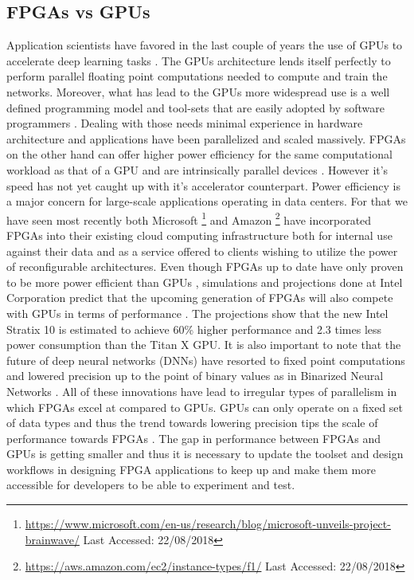 \subsection{FPGAs vs GPUs}
Application scientists have favored in the last couple of years the use of GPUs to accelerate deep learning tasks \cite{raina2009large}. The GPUs architecture lends itself perfectly to perform parallel floating point computations needed to compute and train the networks. Moreover, what has lead to the GPUs more widespread use is a well defined programming model and tool-sets that are easily adopted by software programmers \cite{cuda}. Dealing with those needs minimal experience in hardware architecture and applications have been parallelized and scaled massively. 
FPGAs on the other hand can offer higher power efficiency for the same computational workload as that of a GPU and are intrinsically parallel devices \cite{nurvitadhi2017can}. However it’s speed has not yet caught up with it’s accelerator counterpart. Power efficiency is a major concern for large-scale applications operating in data centers. For that we have seen most recently both Microsoft \footnote{\url{https://www.microsoft.com/en-us/research/blog/microsoft-unveils-project-brainwave/} Last Accessed: 22/08/2018} and Amazon \footnote{\url{https://aws.amazon.com/ec2/instance-types/f1/} Last Accessed: 22/08/2018} have incorporated FPGAs into their existing cloud computing infrastructure both for internal use against their data and as a service offered to clients wishing to utilize the power of reconfigurable architectures. 
Even though FPGAs up to date have only proven to be more power efficient than GPUs \cite{deepfpga, nurvitadhi2017can}, simulations and projections done at Intel Corporation predict that the upcoming generation of FPGAs will also compete with GPUs in terms of performance \cite{nurvitadhi2017can}. The projections show that the new Intel Stratix 10 is estimated to achieve 60\% higher performance and 2.3 times less power consumption than the Titan X GPU. It is also important to note that the future of deep neural networks (DNNs) have resorted to fixed point computations and lowered precision up to the point of binary values as in Binarized Neural Networks \cite{hubara2016binarized}. All of these innovations have lead to irregular types of parallelism in which FPGAs excel at compared to GPUs. GPUs can only operate on a fixed set of data types and thus the trend towards lowering precision tips the scale of performance towards FPGAs \cite{hubara2016binarized, sahin2006neuralprec, nurvitadhi2017can}. The gap in performance between FPGAs and GPUs is getting smaller and thus it is necessary to update the toolset and design workflows in designing FPGA applications to keep up and make them more accessible for developers to be able to experiment and test. 


